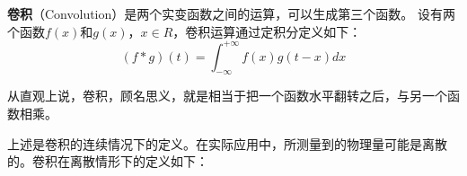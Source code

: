 
\textbf{卷积}（Convolution）是两个实变函数之间的运算，可以生成第三个函数。
设有两个函数$f(x)$和$g(x)$，$x \in R$，卷积运算通过定积分定义如下：
\begin{equation}
(f*g)(t) = \int_{ - \infty }^{ + \infty } {f(x)g(t - x)dx}
\end{equation}

从直观上说，卷积，顾名思义，就是相当于把一个函数水平翻转之后，与另一个函数相乘。

上述是卷积的连续情况下的定义。在实际应用中，所测量到的物理量可能是离散的。卷积在离散情形下的定义如下：

